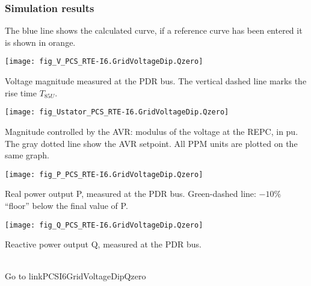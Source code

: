     \subsubsection{Simulation results}
    The blue line shows the calculated curve, if a reference curve has been entered it is
    shown in orange.

    \noindent
    \begin{minipage}[t]{0.48\textwidth}
        \centering
        \texttt{[image: fig\_V\_PCS\_RTE-I6.GridVoltageDip.Qzero]}
        \begin{minipage}[t]{0.8\textwidth}
            \small Voltage magnitude measured at the PDR bus.
            The vertical dashed line marks the rise time $T_{85U}$.
        \end{minipage}
    \end{minipage}
    \hfill
    \begin{minipage}[t]{0.48\textwidth}
        \centering
        \texttt{[image: fig\_Ustator\_PCS\_RTE-I6.GridVoltageDip.Qzero]}
        \begin{minipage}[t]{0.8\textwidth}
            \small Magnitude controlled by the AVR: modulus of the voltage at the REPC, in pu.
            The gray dotted line show the AVR setpoint. All PPM units are plotted on the same
            graph.
        \end{minipage}
    \end{minipage}

    \vspace{0.5cm}

    \noindent
    \begin{minipage}[t]{0.48\textwidth}
        \centering
        \texttt{[image: fig\_P\_PCS\_RTE-I6.GridVoltageDip.Qzero]}
        \begin{minipage}[t]{0.8\textwidth}
            \small Real power output P, measured at the PDR bus. Green-dashed
            line: $-10\%$ ``floor'' below the final value of P.
        \end{minipage}
    \end{minipage}
    \hfill
    \begin{minipage}[t]{0.48\textwidth}
        \centering
        \texttt{[image: fig\_Q\_PCS\_RTE-I6.GridVoltageDip.Qzero]}
        \begin{minipage}[t]{0.8\textwidth}
            \small Reactive power output Q, measured at the PDR bus.
        \end{minipage}
    \end{minipage}
    \\[2\baselineskip]
    Go to  {{ linkPCSI6GridVoltageDipQzero }}


